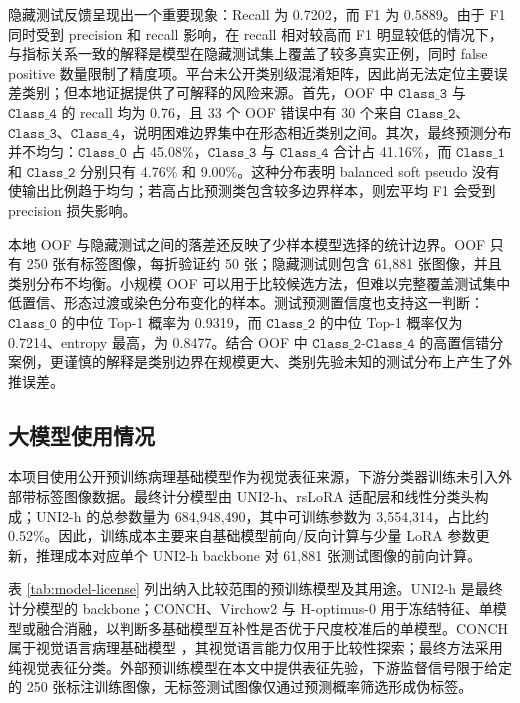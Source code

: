 \documentclass[a4paper,12pt]{article}
\newcommand{\cls}[1]{\texttt{Class\_#1}}
\begin{document}
隐藏测试反馈呈现出一个重要现象：Recall 为 0.7202，而 F1 为 0.5889。由于 F1 同时受到 precision 和 recall 影响，在 recall 相对较高而 F1 明显较低的情况下，与指标关系一致的解释是模型在隐藏测试集上覆盖了较多真实正例，同时 false positive 数量限制了精度项。平台未公开类别级混淆矩阵，因此尚无法定位主要误差类别；但本地证据提供了可解释的风险来源。首先，OOF 中 \(\cls{3}\) 与 \(\cls{4}\) 的 recall 均为 0.76，且 33 个 OOF 错误中有 30 个来自 \(\cls{2}\)、\(\cls{3}\)、\(\cls{4}\)，说明困难边界集中在形态相近类别之间。其次，最终预测分布并不均匀：\(\cls{0}\) 占 45.08\%，\(\cls{3}\) 与 \(\cls{4}\) 合计占 41.16\%，而 \(\cls{1}\) 和 \(\cls{2}\) 分别只有 4.76\% 和 9.00\%。这种分布表明 balanced soft pseudo 没有使输出比例趋于均匀；若高占比预测类包含较多边界样本，则宏平均 F1 会受到 precision 损失影响。

本地 OOF 与隐藏测试之间的落差还反映了少样本模型选择的统计边界。OOF 只有 250 张有标签图像，每折验证约 50 张；隐藏测试则包含 61,881 张图像，并且类别分布不均衡。小规模 OOF 可以用于比较候选方法，但难以完整覆盖测试集中低置信、形态过渡或染色分布变化的样本。测试预测置信度也支持这一判断：\(\cls{0}\) 的中位 Top-1 概率为 0.9319，而 \(\cls{2}\) 的中位 Top-1 概率仅为 0.7214、entropy 最高，为 0.8477。结合 OOF 中 \(\cls{2}\)-\(\cls{4}\) 的高置信错分案例，更谨慎的解释是类别边界在规模更大、类别先验未知的测试分布上产生了外推误差。

\subsection{大模型使用情况}

本项目使用公开预训练病理基础模型作为视觉表征来源，下游分类器训练未引入外部带标签图像数据。最终计分模型由 UNI2-h、rsLoRA 适配层和线性分类头构成；UNI2-h 的总参数量为 684,948,490，其中可训练参数为 3,554,314，占比约 0.52\%。因此，训练成本主要来自基础模型前向/反向计算与少量 LoRA 参数更新，推理成本对应单个 UNI2-h backbone 对 61,881 张测试图像的前向计算。

表 \ref{tab:model-license} 列出纳入比较范围的预训练模型及其用途。UNI2-h 是最终计分模型的 backbone；CONCH、Virchow2 与 H-optimus-0 用于冻结特征、单模型或融合消融，以判断多基础模型互补性是否优于尺度校准后的单模型。CONCH 属于视觉语言病理基础模型 \cite{lu2024conch}，其视觉语言能力仅用于比较性探索；最终方法采用纯视觉表征分类。外部预训练模型在本文中提供表征先验，下游监督信号限于给定的 250 张标注训练图像，无标签测试图像仅通过预测概率筛选形成伪标签。
\end{document}
